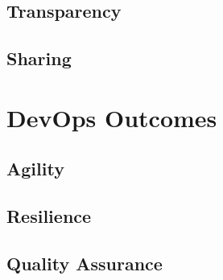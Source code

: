 \subsection{Transparency}

\subsection{Sharing}

\section{DevOps Outcomes}

\subsection{Agility}

\subsection{Resilience}

\subsection{Quality Assurance}
